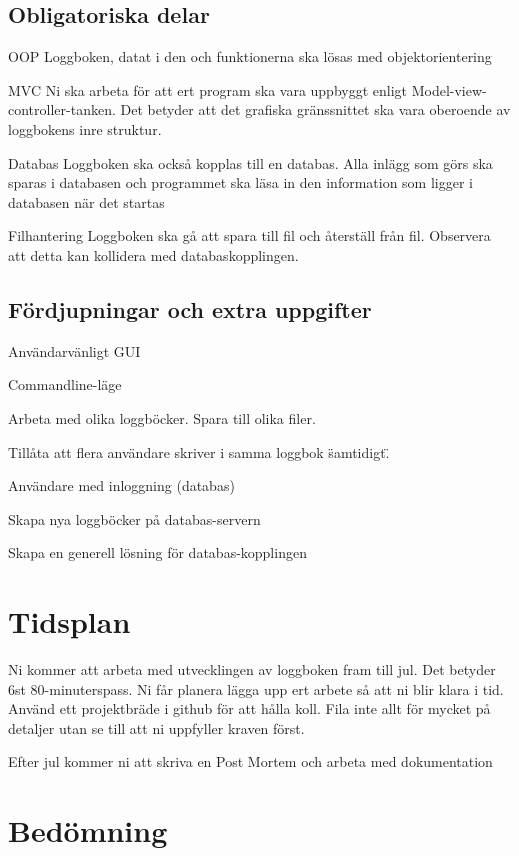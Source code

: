 \documentclass[11pt]{article}
\begin{document}
        \subsection{Obligatoriska delar}
            \begin{enumeration}
                \item [OOP] Loggboken, datat i den och funktionerna ska lösas med objektorientering
                \item [MVC] Ni ska arbeta för att ert program ska vara uppbyggt enligt Model-view-controller-tanken.
                Det betyder att det grafiska gränssnittet ska vara oberoende av loggbokens inre struktur.
                \item [Databas] Loggboken ska också kopplas till en databas. Alla inlägg som görs ska sparas i databasen
                och programmet ska läsa in den information som ligger i databasen när det startas
                \item [Filhantering] Loggboken ska gå att spara till fil och återställ från fil. Observera att detta kan
                kollidera med databaskopplingen.

            \end{enumeration}
        \subsection{Fördjupningar och extra uppgifter}
            \begin{enumeration}
                \item Användarvänligt GUI
                \item Commandline-läge
                \item Arbeta med olika loggböcker. Spara till olika filer.
                \item Tillåta att flera användare skriver i samma loggbok \"samtidigt\".
                \item Användare med inloggning (databas)
                \item Skapa nya loggböcker på databas-servern
                \item Skapa en generell lösning för databas-kopplingen
            \end{enumeration}
    \section{Tidsplan}
        Ni kommer att arbeta med utvecklingen av loggboken fram till jul. Det betyder 6st 80-minuterspass. Ni får planera
        lägga upp ert arbete så att ni blir klara i tid. Använd ett projektbräde i github för att hålla koll. Fila inte
        allt för mycket på detaljer utan se till att ni uppfyller kraven först.

        Efter jul kommer ni att skriva en Post Mortem och arbeta med dokumentation
    \section{Bedömning}
\end{document}
